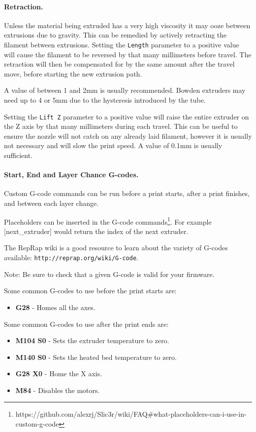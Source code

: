 \paragraph{Retraction.} %
\label{par:retraction}
Unless the material being extruded has a very high viscosity it may ooze between extrusions due to gravity.  This can be remedied by actively retracting the filament between extrusions.  Setting the \texttt{Length} parameter to a positive value will cause the filament to be reversed by that many millimeters before travel.  The retraction will then be compensated for by the same amount after the travel move, before starting the new extrusion path.

A value of between 1 and 2mm is usually recommended. Bowden extruders may need up to 4 or 5mm due to the hysteresis introduced by the tube.

Setting the \texttt{Lift Z} parameter to a positive value will raise the entire extruder on the Z axis by that many millimeters during each travel.  This can be useful to ensure the nozzle will not catch on any already laid filament, however it is usually not necessary and will slow the print speed.  A value of 0.1mm is usually sufficient.

\paragraph{Start, End and Layer Chance G-codes.} %
\label{par:start_end_g_code}
Custom G-code commands can be run before a print starts, after a print finishes, and between each layer change.

Placeholders can be inserted in the G-code commands\footnote{https://github.com/alexrj/Slic3r/wiki/FAQ\#what-placeholders-can-i-use-in-custom-g-code}.  For example [next\_extruder] would return the index of the next extruder.

The RepRap wiki is a good resource to learn about the variety of G-codes available: \texttt{http://reprap.org/wiki/G-code}.  

Note: Be sure to check that a given G-code is valid for your firmware.

Some common G-codes to use before the print starts are:
\begin{itemize}
	\item \textbf{G28}  - Homes all the axes.
\end{itemize}


Some common G-codes to use after the print ends are:
\begin{itemize}
	\item \textbf{M104 S0}  - Sets the extruder temperature to zero.
	\item \textbf{M140 S0} - Sets the heated bed temperature to zero.
	\item \textbf{G28 X0} - Home the X axis.
	\item \textbf{M84}  - Disables the motors.
\end{itemize}
